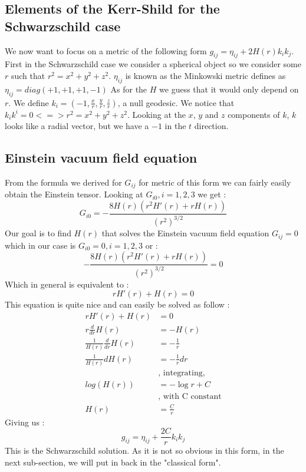 \documentclass[a4paper,12pt]{article}
\begin{document}
\subsection{Elements of the Kerr-Shild for the Schwarzschild case}
We now want to focus on a metric of the following form $g_{ij}=\eta_{ij}+2H(r)k_ik_j$.
First in the Schwarzschild case we consider a spherical object so we consider some $r$ such that $r^2=x^2+y^2+z^2$.
$\eta_{ij}$ is known as the Minkowski metric defines as $\eta_{ij}=diag(+1,+1,+1,-1)$
As for the $H$ we guess that it would only depend on $r$.
We define $k_i=(-1,\frac{x}{r},\frac{y}{r},\frac{z}{r})$, a null geodesic.
We notice that $k_ik^i=0 <=> r^2=x^2+y^2+z^2$.
Looking at the $x$, $y$ and $z$ components of $k$, $k$ looks like a radial vector, but we have a $-1$ in the $t$ direction.
\subsection{Einstein vacuum field equation}
From the formula we derived for $G_{ij}$ for metric of this form we can fairly easily obtain the Einstein tensor.
Looking at $G_{i0}, i=1,2,3$ we get :
\begin{equation}
	G_{i0}=-\frac{8 H(r) \left(r^2 H'(r)+rH(r)\right)}{\left(r^2\right)^{3/2}}
\end{equation}
Our goal is to find $H(r)$ that solves the Einstein vacuum field equation $G_{ij}=0$ which in our case is $G_{i0}=0, i=1,2,3$ or :
\begin{equation}
	-\frac{8 H(r) \left(r^2 H'(r)+rH(r)\right)}{\left(r^2\right)^{3/2}}=0
\end{equation}
Which in general is equivalent to :
\begin{equation}
	rH'(r)+H(r)=0
\end{equation}
This equation is quite nice and can easily be solved as follow :
\begin{align*}
	rH'(r)+H(r)&=0\\
	r\frac{d}{dr}H(r)&=-H(r)\\
	\frac{1}{H(r)}\frac{d}{dr}H(r)&=-\frac{1}{r}\\
	\frac{1}{H(r)}dH(r)&=-\frac{1}{r}dr \;\\
	&\text{, integrating,}\\
	log(H(r))&=-\log{r}+C \;\\
	&\text{, with C constant}\\
	H(r)&=\frac{C}{r}
\end{align*}
Giving us :
\begin{equation}
	g_{ij}=\eta_{ij}+\frac{2C}{r}k_ik_j
\end{equation}
This is the Schwarzschild solution. As it is not so obvious in this form, in the next sub-section, we will put in back in the "classical form".
\end{document}
